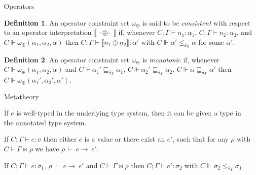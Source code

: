 \documentclass[serif,professionalfont]{beamer}
\renewcommand{\leq}{\leqslant}
\newcommand{\Reduce}[3][\rho]{#1~\vdash~#2 \longrightarrow~#3}
\newcommand{\InterpretOp}[1]{\llbracket #1 \rrbracket}
\newcommand{\Judge}[3][C; \Gamma]{{#1 \vdash #2 : #3}}              %
\newcommand{\Centail}[2][C]{{#1 \Vdash #2}}
\newcommand{\Ref}{\delta}
\newcommand{\Exn}{\chi}
\newcommand{\EC}[3][C]{{#1 \vdash #2 \bowtie #3}}
\theoremstyle{plain}
\theoremstyle{definition}
\newtheorem{mydef}{Definition}
\begin{document}
\begin{frame}{Operators}

    \begin{mydef}\label{operator-consistency}%
An operator constraint set $\omega_\oplus$ is said to be \emph{consistent} with respect to an operator interpretation $\InterpretOp{\ \cdot\oplus\cdot\ }$ if, whenever $\Judge{n_1}{\alpha_1}$, $\Judge{n_2}{\alpha_2}$, and $\Centail{\omega_\oplus(\alpha_1, \alpha_2, \alpha)}$ then $\Judge{\InterpretOp{n_1 \oplus n_2}}{\alpha'}$ with $\Centail{\alpha' \leq_{\Ref\Exn} \alpha}$ for some $\alpha'$.
\end{mydef}
\begin{mydef}\label{operator-monotonicity}%
An operator constraint set $\omega_\oplus$ is \emph{monotonic} if, whenever $\Centail{\omega_\oplus(\alpha_1, \alpha_2, \alpha)}$ and $\Centail{\alpha_1' \sqsubseteq_{\Ref\Exn} \alpha_1}$, $\Centail{\alpha_2' \sqsubseteq_{\Ref\Exn} \alpha_2}$, $\Centail{\alpha \sqsubseteq_{\Ref\Exn} \alpha'}$ then $\Centail{\omega_\oplus(\alpha_1', \alpha_2', \alpha')}$.
\end{mydef}

\end{frame}

\begin{frame}{Metatheory}

    \begin{theorem}
    If $e$ is well-typed in the underlying type system, then it can be given a type in the annotated type system.
    \end{theorem}

    \begin{theorem}[Progress]
        If $\Judge{e}{\sigma}$ then either $e$ is a value or there exist an $e'$, such that for any $\rho$ with $\EC{\Gamma}{\rho}$ we have $\Reduce{e}{e'}$.
    \end{theorem}

    \begin{theorem}[Preservation]
    If $\Judge{e}{\sigma_1}$, $\Reduce{e}{e'}$ and $\EC{\Gamma}{\rho}$ then $\Judge{e'}{\sigma_2}$ with $C \Vdash \sigma_2 \leq_{\Ref\Exn} \sigma_1$.
    \end{theorem}

\end{frame}
\end{document}

